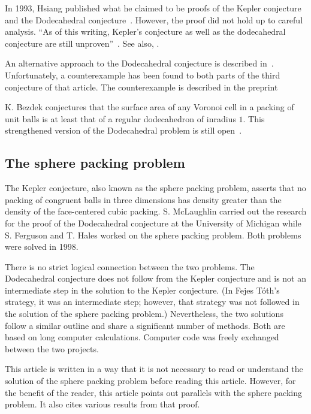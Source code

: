 \documentclass{article} %
\begin{document}
In 1993, Hsiang published what he claimed to be proofs of the Kepler
conjecture and the Dodecahedral conjecture~\cite{Hsiang:1993:IJM}.
However, the proof did not hold up to careful analysis.  ``As of this
writing, Kepler's conjecture as well as the dodecahedral conjecture
are still unproven''~\cite[p761]{Bezdek:1997:IJM}.  See also, \cite{Hales:1994:MI}.

An alternative approach to the Dodecahedral conjecture is described
in~\cite{Bezdek:1997:IJM}.  Unfortunately, a counterexample has been found to
both parts of the third conjecture of that article.  The counterexample
is described in the preprint~\cite{Hales:2002:Dodec}

K. Bezdek conjectures that the surface area of any Voronoi cell in a packing
of unit balls is at least that of a regular dodecahedron of inradius $1$.
This strengthened version of the Dodecahedral problem is still
open~\cite{Bezdek:2004:WSP}.

\subsection{The sphere packing problem}

The Kepler conjecture, also known as the sphere packing problem,
asserts that no packing of congruent balls in three dimensions has
density greater than the density of the face-centered cubic packing.
S. McLaughlin carried out the research for the proof of the
Dodecahedral conjecture at the University of Michigan
while S. Ferguson and T. Hales worked on the sphere packing problem.
Both problems were solved in 1998.

There is no strict logical connection between the two problems. The
Dodecahedral conjecture does not follow from the Kepler conjecture and
is not an intermediate step in the solution to the Kepler conjecture.
(In Fejes T\'oth's strategy, it was an intermediate step; however,
that strategy was not followed in the solution of the sphere packing
problem.) Nevertheless, the two solutions follow a similar outline and
share a significant number of methods. Both are based on long computer
calculations. Computer code was freely exchanged between the two
projects.

This article is written in a way that it is not necessary to read or
understand the solution of the sphere packing problem before reading
this article. However, for the benefit of the reader, this article
points out parallels with the sphere packing problem. It also cites
various results from that proof.
\end{document}
